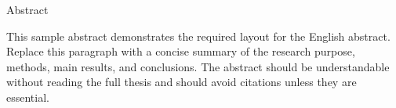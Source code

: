 \clearpage
\thispagestyle{empty}

\begin{center}

    {\fontsize{20pt}{24pt}\selectfont
        \ThesisTitle \par}

    \vspace{1.6cm}

    {\fontsize{14pt}{16pt}\selectfont
        \ThesisAuthor \par}

    \vspace{0.4cm}

    {\fontsize{14pt}{24pt}
        \selectfont
        \ThesisSchool \par
        \ThesisUniversity \par
    }

    \vspace{1.0cm}

    {\fontsize{14pt}{16pt}\selectfont Abstract\par}

\end{center}

\noindent
This sample abstract demonstrates the required layout for the English abstract. Replace this paragraph with a concise summary of the research purpose, methods, main results, and conclusions. The abstract should be understandable without reading the full thesis and should avoid citations unless they are essential.

